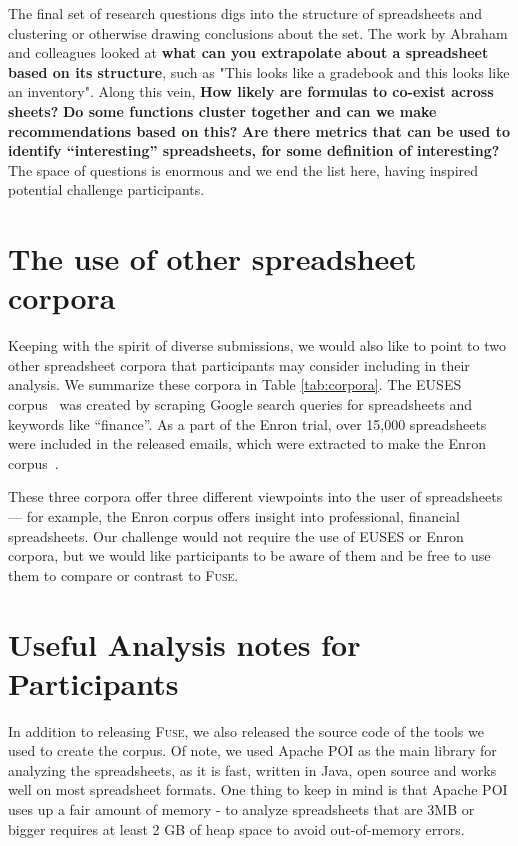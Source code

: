 \documentclass[conference]{IEEEtran}
\begin{document}
The final set of research questions digs into the structure of spreadsheets and clustering or otherwise drawing conclusions about the set.
The work by Abraham and colleagues \cite{Abraham2006} looked at \textbf{what can you extrapolate about a spreadsheet based on its structure}, such as "This looks like a gradebook and this looks like an inventory".
Along this vein, \textbf{How likely are formulas to co-exist across sheets?} 
\textbf{Do some functions cluster together and can we make recommendations based on this? }
\textbf{Are there metrics that can be used to identify ``interesting'' spreadsheets, for some definition of interesting?}
The space of questions is enormous and we end the list here, having inspired potential challenge participants.


\section{The use of other spreadsheet corpora}
Keeping with the spirit of diverse submissions, we would also like to point to two other spreadsheet corpora that participants may consider including in their analysis.
We summarize these corpora in Table \ref{tab:corpora}.
The EUSES corpus~\cite{Fisher2005} was created by scraping Google search queries for spreadsheets and keywords like ``finance''.
As a part of the Enron trial, over 15,000 spreadsheets were included in the released emails, which were extracted to make the Enron corpus~\cite{Hermans2015}.

These three corpora offer three different viewpoints into the user of spreadsheets --- for example, the Enron corpus offers insight into professional, financial spreadsheets.
Our challenge would not require the use of EUSES or Enron corpora, but we would like participants to be aware of them and be free to use them to compare or contrast to \textsc{Fuse}.



\section{Useful Analysis notes for Participants}

In addition to releasing \textsc{Fuse}, we also released the source code of the tools we used to create the corpus.
Of note, we used Apache POI as the main library for analyzing the spreadsheets, as it is fast, written in Java, open source and works well on most spreadsheet formats.
One thing to keep in mind is that Apache POI uses up a fair amount of memory - to analyze spreadsheets that are 3MB or bigger requires at least 2 GB of heap space to avoid out-of-memory  errors.
\end{document}
